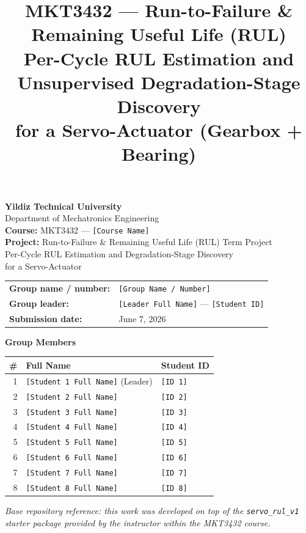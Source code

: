 \documentclass[11pt,a4paper]{article}
\title{\vspace{-1.5cm}\textbf{MKT3432 --- Run-to-Failure \& Remaining Useful Life (RUL)}\\[0.3em]
\large Per-Cycle RUL Estimation and Unsupervised Degradation-Stage Discovery\\for a Servo-Actuator (Gearbox + Bearing)}
\date{}
\newcommand{\code}[1]{\texttt{\small #1}}
\begin{document}
\begin{titlepage}
\centering
\vspace*{1.5cm}
{\Large\bfseries Yildiz Technical University}\\[0.3em]
{\large Department of Mechatronics Engineering}\\[2.0cm]

{\large\bfseries Course:} MKT3432 --- \texttt{[Course Name]}\\[0.4em]
{\large\bfseries Project:} Run-to-Failure \& Remaining Useful Life (RUL) Term Project\\
Per-Cycle RUL Estimation and Degradation-Stage Discovery\\for a Servo-Actuator\\[1.5cm]

\begin{tabular}{ll}
\textbf{Group name / number:} & \texttt{[Group Name / Number]}\\[0.4em]
\textbf{Group leader:} & \texttt{[Leader Full Name]} --- \texttt{[Student ID]}\\[0.4em]
\textbf{Submission date:} & June 7, 2026\\
\end{tabular}

\vspace{1.0cm}
{\bfseries Group Members}\\[0.4em]
\begin{tabular}{r l l}
\toprule
\# & Full Name & Student ID\\
\midrule
1 & \texttt{[Student 1 Full Name]} (Leader) & \texttt{[ID 1]}\\
2 & \texttt{[Student 2 Full Name]} & \texttt{[ID 2]}\\
3 & \texttt{[Student 3 Full Name]} & \texttt{[ID 3]}\\
4 & \texttt{[Student 4 Full Name]} & \texttt{[ID 4]}\\
5 & \texttt{[Student 5 Full Name]} & \texttt{[ID 5]}\\
6 & \texttt{[Student 6 Full Name]} & \texttt{[ID 6]}\\
7 & \texttt{[Student 7 Full Name]} & \texttt{[ID 7]}\\
8 & \texttt{[Student 8 Full Name]} & \texttt{[ID 8]}\\
\bottomrule
\end{tabular}

\vfill
{\small\itshape Base repository reference: this work was developed on top of the
\code{servo\_rul\_v1} starter package provided by the instructor within the
MKT3432 course.}
\end{titlepage}
\end{document}

